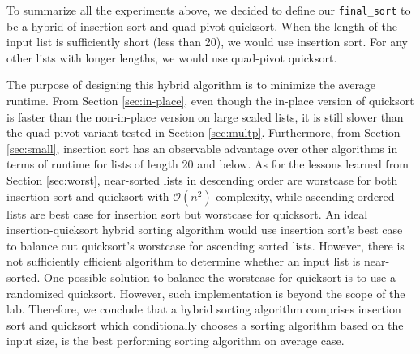 \documentclass[titlepage, 12pt]{article}
\begin{document}
To summarize all the experiments above, we decided to define our
\texttt{final\_sort} to be a hybrid of insertion sort and quad-pivot quicksort.
When the length of the input list is sufficiently short (less than 20), we would
use insertion sort. For any other lists with longer lengths, we would use
quad-pivot quicksort.

The purpose of designing this hybrid algorithm is to minimize the average
runtime. From Section \ref{sec:in-place}, even though the in-place version of
quicksort is faster than the non-in-place version on large scaled lists, it is
still slower than the quad-pivot variant tested in Section \ref{sec:multp}.
Furthermore, from Section \ref{sec:small}, insertion sort has an observable
advantage over other algorithms in terms of runtime for lists of length 20 and
below. As for the lessons learned from Section \ref{sec:worst}, near-sorted
lists in descending order are worstcase for both insertion sort and quicksort
with \( \mathcal{O}(n^2) \) complexity, while ascending ordered lists are best
case for insertion sort but worstcase for quicksort. An ideal
insertion-quicksort hybrid sorting algorithm would use insertion sort's best
case to balance out quicksort's worstcase for ascending sorted lists. However,
there is not sufficiently efficient algorithm to determine whether an input list
is near-sorted. One possible solution to balance the worstcase for quicksort is
to use a randomized quicksort. However, such implementation is beyond the scope
of the lab. Therefore, we conclude that a hybrid sorting algorithm comprises
insertion sort and quicksort which conditionally chooses a sorting algorithm
based on the input size, is the best performing sorting algorithm on average
case.
\end{document}
